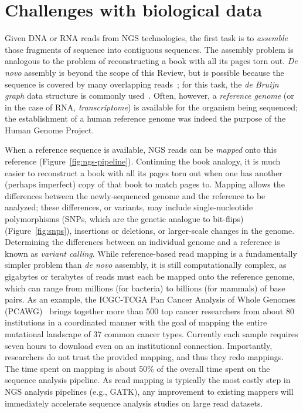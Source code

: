 \documentclass{acm_proc_article-sp}
\begin{document}
\section{Challenges with biological data}

Given DNA or RNA reads from NGS technologies, the first task is to 
\emph{assemble} those fragments of sequence into contiguous sequences.
The assembly problem is analogous to the problem of 
reconstructing a book with all its pages torn out.
\emph{De novo} assembly is beyond the scope of this Review, but is
possible because the sequence is covered by many
overlapping reads~\cite{berger2013computational}; for this task, the \emph{de Bruijn graph}
data structure is commonly used~\cite{bruijn1946combinatorial}.
Often, however, a \emph{reference genome} (or in the case of RNA, 
\emph{transcriptome}) is available for the organism being sequenced; the
establishment of a human reference genome was indeed the purpose of the Human
Genome Project.

When a reference sequence is available, NGS reads can be \emph{mapped} onto
this reference (Figure~\ref{fig:ngs-pipeline}).
Continuing the book analogy, it is much easier to reconstruct a book with all its pages torn out when one has another (perhaps imperfect) copy of that book to match pages to.
Mapping allows the differences between the newly-sequenced genome and the 
reference to be analyzed; these differences, or variants, may include single-nucleotide polymorphisms
(SNPs, which are the genetic analogue to bit-flips) (Figure~\ref{fig:snps}), 
insertions or deletions, or larger-scale changes in the genome.
Determining the differences between an individual genome and a reference is
known as \emph{variant calling}.
While reference-based read mapping is a fundamentally simpler problem than
\emph{de novo} assembly, it is still computationally complex, as gigabytes or
terabytes of reads must each be mapped onto the reference genome, which can 
range from millions (for bacteria) to billions (for mammals) of base pairs.
As an example, the ICGC-TCGA Pan Cancer Analysis of Whole Genomes 
(PCAWG)~\cite{weinstein2013cancer} brings together more than 500 top cancer 
researchers from about 80 institutions in a coordinated manner with the goal of 
mapping the entire mutational landscape of 37 common cancer types. 
Currently each sample requires seven hours to download even on an institutional 
connection. 
Importantly, researchers do not trust the provided mapping, and thus they redo mappings. 
The time spent on mapping is about 50\% of the overall time spent on the sequence analysis pipeline. 
As read mapping is typically the most costly step in NGS analysis pipelines (e.g., GATK), any improvement to existing mappers will immediately accelerate sequence analysis studies on large read datasets.
\end{document}
